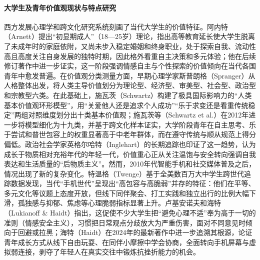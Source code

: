 \paragraph{大学生及青年价值观现状与特点研究}
西方发展心理学和跨文化研究系统刻画了当代大学生的价值特征。阿内特（Arnett）提出“初显期成人”（18—25岁）理论，指出高等教育延长使大学生脱离了未成年时的家庭依附，又尚未步入稳定婚姻和终身职业，处于探索自我、流动性高且高度关注自身发展的独特时期，因此格外看重自主决策和多元体验\cite{Arnett2000}；他在后续修订著作中进一步证实，这一阶段强调情感自主与个性探索的价值倾向在当代各国青年中愈发普遍\cite{Arnett2023}。在价值观分类测量方面，早期心理学家斯普朗格（Spranger）从人格整体出发，将人类主导价值划分为理论型、经济型、审美型、社会型、政治型和宗教型六类\cite{Spranger2017}。在此基础上，施瓦茨（Schwartz）构建了极具国际影响力的“人类基本价值观环形模型”，用“关爱他人还是追求个人成功”“乐于求变还是看重传统稳定”两组对照维度划分出十类基本价值观\cite{Schwartz1992}；施瓦茨等（Schwartz et al.）在2012年进一步将模型细化为十九类，并基于跨文化样本证实，大学阶段青年在自主思考、乐于尝试和普世包容上的权重显著高于中老年群体，而在遵守传统与顺从规范上得分偏低\cite{Schwartz2012}。政治社会学家英格尔哈特（Inglehart）的长期追踪也印证了这一趋势，认为成长于物质相对充裕年代的年轻一代，价值重心正从关注温饱与安全转向强调自我表达和生活质量的“后物质主义”\cite{Inglehart2018}。然而，2010年代智能手机和社交媒体普及之后，情况出现了新的复杂变化。特温格（Twenge）基于全美数百万大中学生跨世代追踪数据发现，当代“手机世代”呈现出“高包容与高脆弱”并存的特征：他们在平等、多元文化等议题上态度开放，但线下同伴聚会、打工实践和独立出行的比例大幅下滑，孤独感与抑郁、焦虑等心理脆弱指标显著上升\cite{Twenge2017}。卢基安诺夫和海特（Lukianoff \& Haidt）指出，这促使不少大学生把“避免心理不适”奉为高于一切的准则（情感安全主义），习惯把日常观点分歧放大为严重伤害，面对不同意见时倾向于回避或拉黑\cite{Lukianoff2018}；海特（Haidt）在2024年的最新著作中进一步追溯其根源，论证青年成长方式从线下自由玩耍、在同伴小摩擦中学会协商，全面转向手机屏幕与虚拟弱连接，剥夺了年轻人在真实交往中锻炼抗挫折能力的机会\cite{Haidt2024}。

